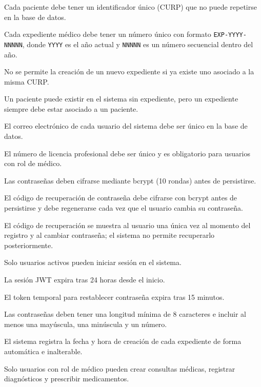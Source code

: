 \documentclass[11pt,a4paper]{article}
\begin{document}
\begin{description}[leftmargin=1.5cm,style=nextline,itemsep=4pt]
    \item[\textbf{RN1:}] Cada paciente debe tener un identificador único (CURP) que no puede repetirse en la base de datos.
    \item[\textbf{RN2:}] Cada expediente médico debe tener un número único con formato \texttt{EXP-YYYY-NNNNN}, donde \texttt{YYYY} es el año actual y \texttt{NNNNN} es un número secuencial dentro del año.
    \item[\textbf{RN3:}] No se permite la creación de un nuevo expediente si ya existe uno asociado a la misma CURP.
    \item[\textbf{RN4:}] Un paciente puede existir en el sistema sin expediente, pero un expediente siempre debe estar asociado a un paciente.
    \item[\textbf{RN5:}] El correo electrónico de cada usuario del sistema debe ser único en la base de datos.
    \item[\textbf{RN6:}] El número de licencia profesional debe ser único y es obligatorio para usuarios con rol de médico.
    \item[\textbf{RN7:}] Las contraseñas deben cifrarse mediante bcrypt (10 rondas) antes de persistirse.
    \item[\textbf{RN8:}] El código de recuperación de contraseña debe cifrarse con bcrypt antes de persistirse y debe regenerarse cada vez que el usuario cambia su contraseña.
    \item[\textbf{RN9:}] El código de recuperación se muestra al usuario una única vez al momento del registro y al cambiar contraseña; el sistema no permite recuperarlo posteriormente.
    \item[\textbf{RN10:}] Solo usuarios activos pueden iniciar sesión en el sistema.
    \item[\textbf{RN11:}] La sesión JWT expira tras 24 horas desde el inicio.
    \item[\textbf{RN12:}] El token temporal para restablecer contraseña expira tras 15 minutos.
    \item[\textbf{RN13:}] Las contraseñas deben tener una longitud mínima de 8 caracteres e incluir al menos una mayúscula, una minúscula y un número.
    \item[\textbf{RN14:}] El sistema registra la fecha y hora de creación de cada expediente de forma automática e inalterable.
    \item[\textbf{RN15:}] Solo usuarios con rol de médico pueden crear consultas médicas, registrar diagnósticos y prescribir medicamentos.

\end{description}
\end{document}
